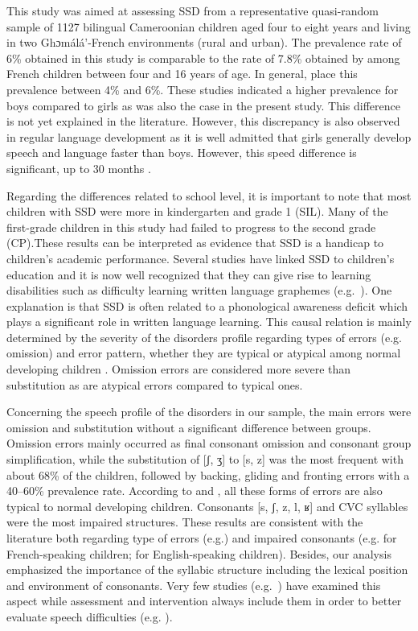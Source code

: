 \documentclass[output=paper,newtxmath,modfonts,nonflat,draftmode]{langsci/langscibook}
\begin{document}
This study was aimed at assessing SSD from a representative quasi-random sample of 1127 bilingual Cameroonian children aged four to eight years and living in two Ghɔmálá’-French environments (rural and urban). The prevalence rate of 6\% obtained in this study is comparable to the rate of 7.8\% obtained by \citet{Fombonne1997} among French children between four and 16 years of age. In general, \citet{Kirkpatrick1984} place this prevalence between 4\% and 6\%. These studies indicated a higher prevalence for boys compared to girls as was also the case in the present study. This difference is not yet explained in the literature. However, this discrepancy is also observed in regular language development as it is well admitted that girls generally develop speech and language faster than boys. However, this speed difference is significant, up to 30 months \citep{Eriksson2012}. 

Regarding the differences related to school level, it is important to note that most children with SSD were more in kindergarten and grade 1 (SIL). Many of the first-grade children in this study had failed to progress to the second grade (CP).These results can be interpreted as evidence that SSD is a handicap to children's academic performance. Several studies have linked SSD to children's education and it is now well recognized that they can give rise to learning disabilities such as difficulty learning written language graphemes (e.g.~\citealt{Rvachew2007}). One explanation is that SSD is often related to a phonological awareness deficit which plays a significant role in written language learning. This causal relation is mainly determined by the severity of the disorders profile regarding types of errors (e.g. omission) and error pattern, whether they are typical or atypical among normal developing children \cite{RvachewChiangEvans2007}. Omission errors are considered more severe than substitution as are atypical errors compared to typical ones.

Concerning the speech profile of the disorders in our sample, the main errors were omission and substitution without a significant difference between groups. Omission errors mainly occurred as final consonant omission and consonant group simplification, while the substitution of [ʃ, ʒ] to [s, z] was the most frequent with about 68\% of the children, followed by backing, gliding and fronting errors with a 40--60\% prevalence rate. According to \citet{RvachewChiangEvans2007} and \citet{Fox2001}, all these forms of errors are also typical to normal developing children. Consonants [s, ʃ, z, l, ʁ] and CVC syllables were the most impaired structures. These results are consistent with the literature both regarding type of errors (e.g.\citealt{Austin1997,Ruscello1991}) and impaired consonants (e.g. \citet{MaurinCherou1993} for French-speaking children; \citet{Shriberg1994} for English-speaking children). Besides, our analysis emphasized the importance of the syllabic structure including the lexical position and environment of consonants. Very few studies (e.g.~\citealt{RvachewChiangEvans2007}) have examined this aspect while assessment and intervention always include them in order to better evaluate speech difficulties (e.g. \citealt{MaurinCherou1993}). 
\end{document}
